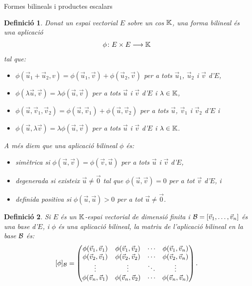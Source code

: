 \documentclass[
  11pt,
]{book}
\makeatletter
\numberwithin{dummy}{section}
\theoremstyle{maincolornumbox}
\theoremstyle{blacknumex}
\theoremstyle{blacknumbox}
\newtheorem{definitionT}{Definició}[chapter]
\theoremstyle{maincolornum}
\newenvironment{definition}{\begin{dBox}\begin{definitionT}}{\end{definitionT}\end{dBox}}
\renewcommand{\section}{\@startsection{section}{1}{\z@}
{-4ex \@plus -1ex \@minus -.4ex}
{1ex \@plus.2ex }
{\normalfont\large\sffamily\bfseries}}
\newlength\esp
\makeatother
\begin{document}
\section{Formes bilineals i productes escalars}\label{formes-bilineals-i-productes-escalars}

\begin{definition}

Donat un espai vectorial \(E\) sobre un cos \(\mathbb{K}\), una \emph{forma bilineal} és
una aplicació \[\phi \colon E \times E \longrightarrow \mathbb{K}\] tal que:

\begin{itemize}
\item
  \(\phi(\vec u_1+\vec u_2,v)=\phi(\vec u_1,\vec v)+\phi(\vec u_2,\vec v)\)
  per a tots \(\vec u_1\), \(\vec u_2\) i \(\vec v\) d'\(E\),
\item
  \(\phi(\lambda \vec u,\vec v)=\lambda \phi(\vec u,\vec v)\) per a tots
  \(\vec u\) i \(\vec v\) d'\(E\) i \(\lambda \in \mathbb{K}\),
\item
  \(\phi(\vec u,\vec v_1,\vec v_2)=\phi(\vec u,\vec v_1)+\phi(\vec u,\vec v_2)\)
  per a tots \(\vec u\), \(\vec v_1\) i \(\vec v_2\) d'\(E\) i
\item
  \(\phi(\vec u,\lambda \vec v)=\lambda \phi(\vec u,\vec v)\) per a tots
  \(\vec u\) i \(\vec v\) d'\(E\) i \(\lambda \in \mathbb{K}\).
\end{itemize}

A més diem que una aplicació bilineal \(\phi\) és:

\begin{itemize}
\item
  \emph{simètrica} si \(\phi(\vec u,\vec v)=\phi(\vec v,\vec u)\) per a tots
  \(\vec u\) i \(\vec v\) d'\(E\),
\item
  \emph{degenerada} si existeix \(\vec u\neq \vec 0\) tal que
  \(\phi(\vec u,\vec v)=0\) per a tot \(\vec v\) d'\(E\), i
\item
  \emph{definida positiva} si \(\phi(\vec u,\vec u)>0\) per a tot
  \(\vec u\neq \vec 0\).
\end{itemize}

\end{definition}

\begin{definition}
\protect\hypertarget{def:mat-apl-bil}{}\label{def:mat-apl-bil}Si \(E\) és un \(\mathbb{K}\)-espai
vectorial de dimensió finita i \(\mathcal{B}=[\vec v_1, \ldots, \vec v_n]\) és
una base d'\(E\), i \(\phi\) és una aplicació bilineal, \emph{la matriu de
l'aplicació bilineal en la base \(\mathcal{B}\)} és:
\[[\phi]_{\mathcal{B}}= \begin{pmatrix}
\phi(\vec v_1,\vec v_1) & \phi(\vec v_1,\vec v_2) & \cdots & \phi(\vec v_1,\vec v_n)\\
\phi(\vec v_2,\vec v_1) & \phi(\vec v_2,\vec v_2) & \cdots & \phi(\vec v_2,\vec v_n)\\
\vdots & \vdots & \ddots & \vdots \\
\phi(\vec v_n,\vec v_1) & \phi(\vec v_n,\vec v_2) & \cdots & \phi(\vec v_n,\vec v_n)
\end{pmatrix}.\]
\end{definition}
\end{document}
